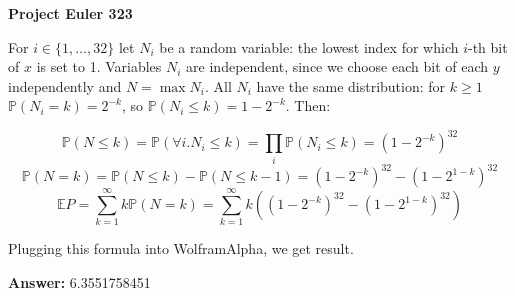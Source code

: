 \documentclass[a4paper,12pt]{article}
\begin{document}
\setlength\parindent{0pt}
\textbf{Project Euler 323}
\vspace{5ex}

For \(i \in \{1, \dots, 32\}\) let \(N_i\) be a random variable: the lowest index for which \(i\)-th bit of \(x\) is set to 1. Variables \(N_i\) are independent, since we choose each bit of each \(y\) independently and \(N = \max N_i\). All \(N_i\) have the same distribution: for \(k \geq 1\) \(\mathbb{P}(N_i = k) = 2^{-k}\), so \(\mathbb{P}(N_i \leq k) = 1 - 2^{-k}\). Then:

\[\mathbb{P}(N \leq k) = \mathbb{P}(\forall i. N_i \leq k) = \prod_i \mathbb{P}(N_i \leq k) = (1-2^{-k})^{32}\]
\[\mathbb{P}(N = k) = \mathbb{P}(N \leq k) - \mathbb{P}(N \leq k - 1) = (1-2^{-k})^{32} - (1-2^{1-k})^{32}\]
\[\mathbb{E}P = \sum_{k = 1}^\infty k\mathbb{P}(N = k) = \sum_{k = 1}^\infty k((1-2^{-k})^{32} - (1-2^{1-k})^{32})\]

Plugging this formula into WolframAlpha, we get result.

\vspace{5ex}
\textbf{Answer:}
6.3551758451
\end{document}
